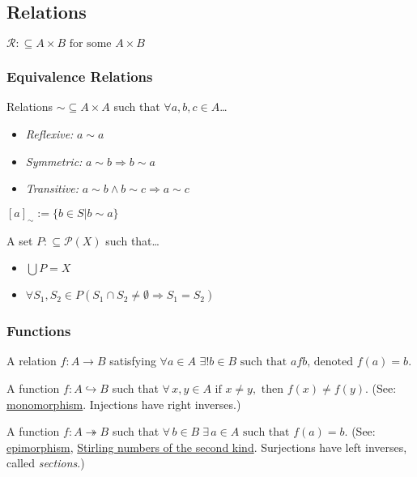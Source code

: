 \subsection{Relations}\label{relations}
$\mathcal{R} :\subseteq A \times B \textrm{ for some } A \times B$

\subsubsection{Equivalence Relations}\label{equivalencerelation}
Relations $\sim \subseteq A \times A$ such that $\forall a,b,c \in A$\dots
\begin{itemize}
  \item \emph{Reflexive:} $a \sim a$
  \item \emph{Symmetric:} $a \sim b \Rightarrow b \sim a$
  \item \emph{Transitive:} $a \sim b \land b \sim c \Rightarrow a \sim c$
\end{itemize}

$[a]_{\sim} := \{ b \in S | b \sim a \}$ 

A set $P :\subseteq \mathcal{P}(X)$ such that\dots
\begin{itemize}
  \item $\bigcup P = X$
  \item $\forall S_1, S_2 \in P (S_1 \cap S_2 \neq \emptyset \Rightarrow S_1 = S_2)$
\end{itemize}

\subsubsection{Functions}\label{function}
A relation $f: A \rightarrow B$ satisfying $\forall a \in A$ \mbox{$\exists! b \in B \textrm{ such that } afb \textrm{, denoted } f(a) = b$.}

\label{injection}
A function $\ensuremath{f: A \hookrightarrow B}$ such that $\forall \, x,y \in A \textrm{ if } x \neq y, \textrm{ then } f(x) \neq f(y)$. (See: \hyperref[monomorphism]{monomorphism}. Injections have right inverses.)

\label{surjection}
A function $\ensuremath{f: A \twoheadrightarrow B}$ such that $\forall \, b \in B \; \exists \, a \in A \textrm{ such that } f(a) = b$. (See: \hyperref[epimorphism]{epimorphism}, \hyperref[secondstirlingnumbers]{Stirling numbers of the second kind}.
Surjections have left inverses, called \emph{sections}.)

